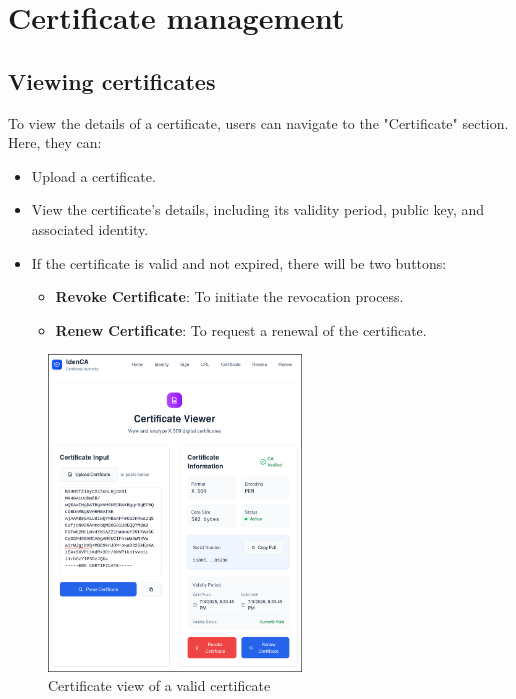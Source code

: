 \section{Certificate management}
\subsection{Viewing certificates}
To view the details of a certificate, users can navigate to the "Certificate" section. Here, they can:
\begin{itemize}
    \item Upload a certificate.
    \item View the certificate's details, including its validity period, public key, and associated identity.
    \item If the certificate is valid and not expired, there will be two buttons:
        \begin{itemize}
            \item \textbf{Revoke Certificate}: To initiate the revocation process.
            \item \textbf{Renew Certificate}: To request a renewal of the certificate.
        \end{itemize}
\end{itemize}
\begin{figure}[h!]
    \centering
    \includegraphics[keepaspectratio, width=0.6\textwidth]{Pic/5_certificate_view.png}
    \caption{Certificate view of a valid certificate}
    \label{fig:certificate-view-1}
\end{figure}


